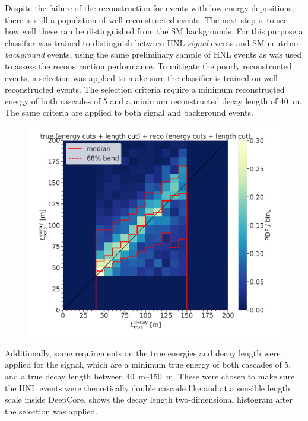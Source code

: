 Despite the failure of the reconstruction for events with low energy depositions, there is still a population of well reconstructed events. The next step is to see how well these can be distinguished from the SM backgrounds. For this purpose a classifier was trained to distinguish between HNL \textit{signal} events and SM neutrino \textit{background} events, using the same preliminary sample of HNL events as was used to assess the reconstruction performance. To mitigate the poorly reconstructed events, a selection was applied to make sure the classifier is trained on well reconstructed events. The selection criteria require a minimum reconstructed energy of both cascades of \SI{5}{\gev} and a minimum reconstructed decay length of \SI{40}{\meter}. The same criteria are applied to both signal and background events.

\begin{figure}[h]
    \centering
    \includegraphics{figures/results/190607/classification/reco_decayL_vs_true_decayL_reco_energy_cut_and_reco_length_cut_and_true_energy_cut_and_true_length_cut_step_contours_weighted.png}
    \caption[]{}
\end{figure}

Additionally, some requirements on the true energies and decay length were applied for the signal, which are a minimum true energy of both cascades of \SI{5}{\gev}, and a true decay length between \SIrange[range-phrase={~and~}]{40}{150}{\meter}. These were chosen to make sure the HNL events were theoretically double cascade like and at a sensible length scale inside DeepCore.  shows the decay length two-dimensional histogram after the selection was applied.

